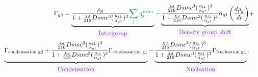 \begin{equation}
\begin{aligned}
\Gamma_{g2}=\underbrace{\frac{\rho_g}{1+\frac{\chi_d}{216}Dsmc^3(\frac{a_{i1}}{\alpha_{g1}})^3}{\color{myteal}\sum_j \eta^{inter}_j}}_{\colorbox{codebackground}{\color{codekeyword3} Intergroup}}- \underbrace{\frac{\frac{\chi_d}{216}Dsmc^3(\frac{a_{i1}}{\alpha_{g1}})^3}{1+\frac{\chi_d}{216}Dsmc^3(\frac{a_{i1}}{\alpha_{g1}})^3}\alpha_{g1}\parent{\frac{d\rho_{g}}{dt}}}_{\colorbox{codebackground}{\color{codekeyword3} Density\ group\ shift}}&+& \\
\underbrace{\Gamma_{\text{condensation g2}} + \frac{\frac{\chi_d}{216}Dsmc^3(\frac{a_{i1}}{\alpha_{g1}})^3}{1+\frac{\chi_d}{216}Dsmc^3(\frac{a_{i1}}{\alpha_{g1}})^3}\Gamma_{\text{condensation g1}}}_{\colorbox{codebackground}{\color{codekeyword3} Condensation}}-\underbrace{\frac{\frac{\chi_d}{216}Dsmc^3(\frac{a_{i1}}{\alpha_{g1}})^3}{1+\frac{\chi_d}{216}Dsmc^3(\frac{a_{i1}}{\alpha_{g1}})^3}\Gamma_{\text{Nucleation g1}}}_{\colorbox{codebackground}{\color{codekeyword3} Nucleation}}.
\end{aligned}
\end{equation}

%
